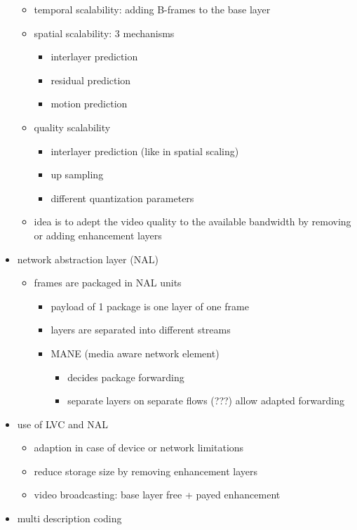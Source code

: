 \documentclass[a4paper,10pt]{scrreprt}
\begin{document}
\begin{itemize}
\begin{itemize}
 \item temporal scalability: adding B-frames to the base layer 
 \item spatial scalability: 3 mechanisms
 \begin{itemize}
  \item interlayer prediction 
  \item residual prediction
  \item motion prediction 
 \end{itemize}
 \item quality scalability
 \begin{itemize}
  \item interlayer prediction (like in spatial scaling)
  \item up sampling
  \item different quantization parameters
 \end{itemize}
 \item idea is to adept the video quality to the available bandwidth by removing or adding enhancement layers 
 \end{itemize}
\item network abstraction layer (NAL)
\begin{itemize}
 \item frames are packaged in NAL units 
 \begin{itemize}
  \item payload of 1 package is one layer of one frame 
  \item layers are separated into different streams
  \item MANE (media aware network element)
  \begin{itemize}
   \item decides package forwarding
   \item separate layers on separate flows (???) allow adapted forwarding 
  \end{itemize}
 \end{itemize}
\end{itemize}
\item use of LVC and NAL
\begin{itemize}
 \item adaption in case of device or network limitations 
 \item reduce storage size by removing enhancement layers 
 \item video broadcasting: base layer free + payed enhancement
\end{itemize}
\item multi description coding 

\end{itemize}
\end{document}
